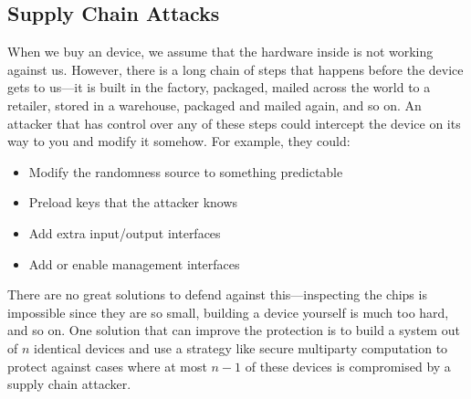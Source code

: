 \subsection{Supply Chain Attacks}
When we buy an device, we assume that the hardware inside is not working against us. However, there is a long chain of steps that happens before the device gets to us---it is built in the factory, packaged, mailed across the world to a retailer, stored in a warehouse, packaged and mailed again, and so on. An attacker that has control over any of these steps could intercept the device on its way to you and modify it somehow. For example, they could:

\begin{itemize}
	\item Modify the randomness source to something predictable
	\item Preload keys that the attacker knows
	\item Add extra input/output interfaces
	\item Add or enable management interfaces
\end{itemize}

There are no great solutions to defend against this---inspecting the chips is impossible since they are so small, building a device yourself is much too hard, and so on. One solution that can improve the protection is to build a system out of $n$ identical devices and use a strategy like secure multiparty computation to protect against cases where at most $n-1$ of these devices is compromised by a supply chain attacker.
